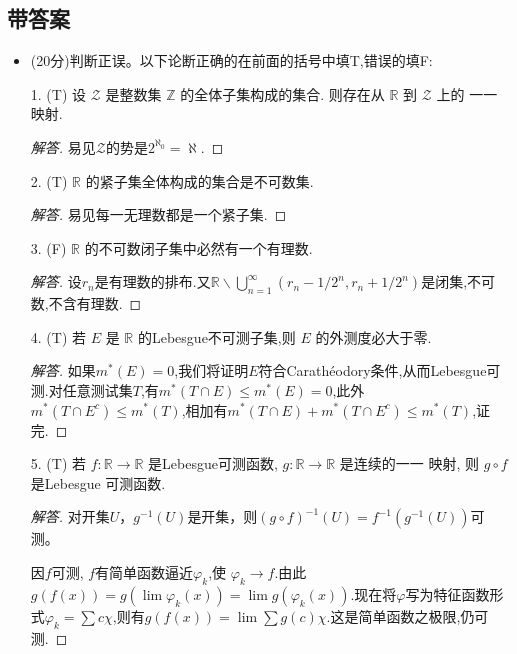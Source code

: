 \subsection{带答案}
\begin{itemize}
\item[一、](20分)判断正误。以下论断正确的在前面的括号中填T,错误的填F:

1. (T) 设 $\mathcal{Z}$ 是整数集 $\mathbb{Z}$ 的全体子集构成的集合.
则存在从 $\mathbb{R}$ 到 $\mathcal{Z}$ 上的 一一映射.

\begin{proof}[解答]
易见$ \mathcal{Z}  $的势是$ 2^{\aleph_{0}}=\aleph $.
\end{proof}

2. (T) $\mathbb{R}$ 的紧子集全体构成的集合是不可数集.

\begin{proof}[解答]
易见每一无理数都是一个紧子集.
\end{proof}

3. (F) $\mathbb{R}$ 的不可数闭子集中必然有一个有理数.

\begin{proof}[解答]
设$ r_{n} $是有理数的排布.又$ \mathbb{R} \backslash \bigcup_{n=1}^{\infty}(r_{n}-1/2^{n},r_{n}+1/2^{n}) $是闭集,不可数,不含有理数.
\end{proof}

4. (T) 若 $E$ 是 $\mathbb{R}$ 的Lebesgue不可测子集,则 $E$ 的外测度必大于零.

\begin{proof}[解答]
如果$ m^{*}(E)=0 $,我们将证明$ E $符合Carathéodory条件,从而Lebesgue可测.对任意测试集$ T $,有$ m^{*}(T\cap E)\le m^{*}(E)=0 $,此外$ m^{*}(T\cap E^{c})\le m^{*}(T) $,相加有$ m^{*}(T\cap E)+m^{*}(T\cap E^{c})\le m^{*}(T)  $,证完.
\end{proof}

5. (T) 若 $f: \mathbb{R} \rightarrow \mathbb{R}$ 是Lebesgue可测函数, $g: \mathbb{R} \rightarrow \mathbb{R}$ 是连续的一一 映射, 则 $g \circ f$ 是Lebesgue 可测函数.

\begin{proof}[解答]
对开集$U$，$g^{-1}(U)$是开集，则$(g\circ f)^{-1}(U)=f^{-1}(g^{-1}(U))$可测。

因$ f $可测, $ f $有简单函数逼近$ \varphi_{k} $,使
$ \varphi_{k}\to f $.由此$ g(f(x))=g(\lim \varphi_{k}(x))=\lim g(\varphi_{k}(x)) $.现在将$ \varphi $写为特征函数形式$ \varphi_{k}=\sum c\chi $,则有$ g(f(x))=\lim \sum g(c)\chi $.这是简单函数之极限,仍可测.
\end{proof}


\end{itemize}
